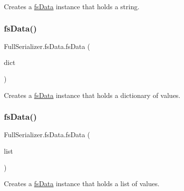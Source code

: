 Creates a \hyperlink{class_full_serializer_1_1fs_data}{fs\+Data} instance that holds a string. 

\mbox{\label{class_full_serializer_1_1fs_data_a8897bc4f6c2f0ff7acdcd0195746fc09}} 
\subsubsection{\texorpdfstring{fs\+Data()}{fsData()}\hspace{0.1cm}{\footnotesize\ttfamily [6/7]}}
{\footnotesize\ttfamily Full\+Serializer.\+fs\+Data.\+fs\+Data (\begin{DoxyParamCaption}\item[{Dictionary$<$ string, \hyperlink{class_full_serializer_1_1fs_data}{fs\+Data} $>$}]{dict }\end{DoxyParamCaption})\hspace{0.3cm}{\ttfamily [inline]}}



Creates a \hyperlink{class_full_serializer_1_1fs_data}{fs\+Data} instance that holds a dictionary of values. 

\mbox{\label{class_full_serializer_1_1fs_data_af6e99c4d2e08a96957ccd44491026e92}} 
\subsubsection{\texorpdfstring{fs\+Data()}{fsData()}\hspace{0.1cm}{\footnotesize\ttfamily [7/7]}}
{\footnotesize\ttfamily Full\+Serializer.\+fs\+Data.\+fs\+Data (\begin{DoxyParamCaption}\item[{List$<$ \hyperlink{class_full_serializer_1_1fs_data}{fs\+Data} $>$}]{list }\end{DoxyParamCaption})\hspace{0.3cm}{\ttfamily [inline]}}



Creates a \hyperlink{class_full_serializer_1_1fs_data}{fs\+Data} instance that holds a list of values. 



